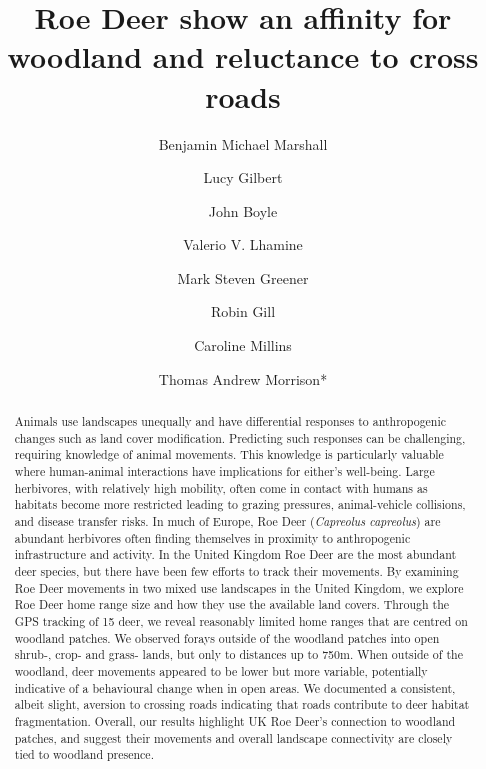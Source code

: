 \documentclass[10pt,a4paper]{article}
\begin{document}
\pagestyle{fancy}

\title{Roe Deer show an affinity for woodland and reluctance to cross roads}
\author[1]{Benjamin Michael Marshall}
\author[1]{Lucy Gilbert}
\author[2]{John Boyle}
\author[1]{Valerio V. Lhamine}
\author[3]{Mark Steven Greener}
\author[4]{Robin Gill}
\author[5]{Caroline Millins}
\author[1]{Thomas Andrew Morrison*}

\maketitle
\thispagestyle{fancy}

\begin{abstract}

Animals use landscapes unequally and have differential responses to anthropogenic changes such as land cover modification. Predicting such responses can be challenging, requiring knowledge of animal movements. This knowledge is particularly valuable where human-animal interactions have implications for either's well-being. Large herbivores, with relatively high mobility, often come in contact with humans as habitats become more restricted leading to grazing pressures, animal-vehicle collisions, and disease transfer risks. In much of Europe, Roe Deer (\emph{Capreolus capreolus}) are abundant herbivores often finding themselves in proximity to anthropogenic infrastructure and activity. In the United Kingdom Roe Deer are the most abundant deer species, but there have been few efforts to track their movements. By examining Roe Deer movements in two mixed use landscapes in the United Kingdom, we explore Roe Deer home range size and how they use the available land covers. Through the GPS tracking of 15 deer, we reveal reasonably limited home ranges that are centred on woodland patches. We observed forays outside of the woodland patches into open shrub-, crop- and grass- lands, but only to distances up to 750m. When outside of the woodland, deer movements appeared to be lower but more variable, potentially indicative of a behavioural change when in open areas. We documented a consistent, albeit slight, aversion to crossing roads indicating that roads contribute to deer habitat fragmentation. Overall, our results highlight UK Roe Deer's connection to woodland patches, and suggest their movements and overall landscape connectivity are closely tied to woodland presence.

\end{abstract}
\end{document}
